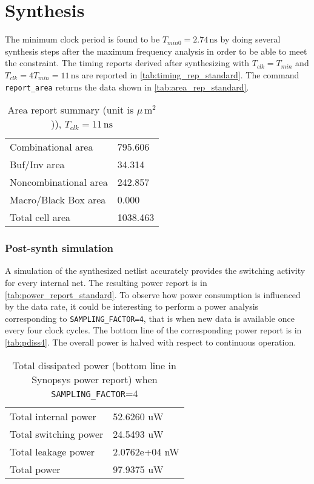\chapter{Synthesis}
The minimum clock period is found to be $T_{min0}=2.74\,\textrm{ns}$ by doing several synthesis steps after the maximum frequency analysis in order to be able to meet the constraint. The timing reports derived after synthesizing with $T_{clk}=T_{min}$ and $T_{clk}=4T_{min}=11\,\textrm{ns}$ are reported in \autoref{tab:timing_rep_standard}.
The command \texttt{report\_area} returns the data shown in \autoref{tab:area_rep_standard}.

\begin{table}[h]
	\centering
	\begin{tabular}{|l|l|}\hline
		Combinational area&                795.606\\
		Buf/Inv area&                       34.314\\
		Noncombinational area&             242.857\\
		Macro/Black Box area&                0.000\\
		Total cell area&                  1038.463\\\hline
		\end{tabular}
	\caption{Area report summary (unit is $\mu\,\textrm{m}^2$)), $T_{clk} = 11\,\textrm{ns}$}
	\label{tab:area_rep_standard}
\end{table}

\subsection{Post-synth simulation}

A simulation of the synthesized netlist accurately provides the switching activity for every internal net. The resulting power report is in \autoref{tab:power_report_standard}. To observe how power consumption is influenced by the data rate, it could be interesting to perform a power analysis corresponding to \texttt{SAMPLING\_FACTOR=4}, that is when new data is available once every four clock cycles. The bottom line of the corresponding power report is in \autoref{tab:pdiss4}. The overall power is halved with respect to continuous operation.
\begin{table}
	\centering
\begin{tabular}{|l|l|}
\hline
Total internal power          &   52.6260 uW  \\
Total switching power &      24.5493 uW \\
Total leakage power &    2.0762e+04 nW    \\
Total power &    97.9375 uW\\\hline
\end{tabular}
\caption{Total dissipated power (bottom line in Synopsys power report) when \texttt{SAMPLING\_FACTOR}=4}
\label{tab:pdiss4}
\end{table}


